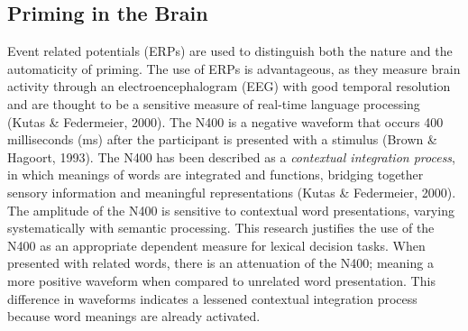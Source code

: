 \documentclass[english,man]{apa6}
\theoremstyle{definition}
\theoremstyle{definition}
\theoremstyle{remark}
\begin{document}
\subsection{Priming in the Brain}\label{priming-in-the-brain}

Event related potentials (ERPs) are used to distinguish both the nature
and the automaticity of priming. The use of ERPs is advantageous, as
they measure brain activity through an electroencephalogram (EEG) with
good temporal resolution and are thought to be a sensitive measure of
real-time language processing (Kutas \& Federmeier, 2000). The N400 is a
negative waveform that occurs 400 milliseconds (ms) after the
participant is presented with a stimulus (Brown \& Hagoort, 1993). The
N400 has been described as a \emph{contextual integration process}, in
which meanings of words are integrated and functions, bridging together
sensory information and meaningful representations (Kutas \& Federmeier,
2000). The amplitude of the N400 is sensitive to contextual word
presentations, varying systematically with semantic processing. This
research justifies the use of the N400 as an appropriate dependent
measure for lexical decision tasks. When presented with related words,
there is an attenuation of the N400; meaning a more positive waveform
when compared to unrelated word presentation. This difference in
waveforms indicates a lessened contextual integration process because
word meanings are already activated.
\end{document}
